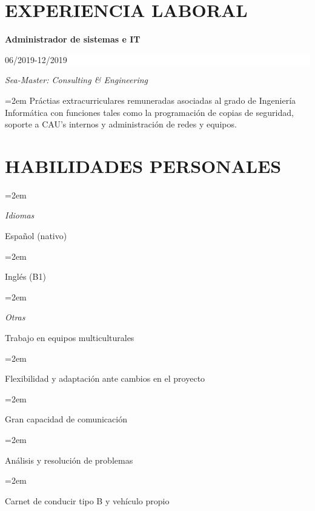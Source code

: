 \documentclass[paper=a4,fontsize=11pt]{scrartcl}
\newlength{\spacebox}
\newcommand{\sepspace}{\vspace*{1em}}		%
\newcommand{\NewPart}[1]{\section*{\uppercase{#1}}}
\newcommand{\PersonalEntry}[2]{
		\noindent\hangindent=2em\hangafter=0 %
		\parbox{\spacebox}{        %
		\textit{#1}}		       %
		\hspace{1.5em} #2 \par}    %
\newcommand{\SkillsEntry}[2]{      %
		\noindent\hangindent=2em\hangafter=0 %
		\parbox{\spacebox}{        %
		\textit{#1}}			   %
		\hspace{1.5em} #2 \par}    %
\newcommand{\EducationEntry}[4]{
		\noindent \textbf{#1} \hfill      %
		\colorbox{White}{%
			\parbox{5cm}{%
			\hfill\color{Black}#2}} \par  %
		\noindent \textit{#3} \par        %
		\noindent\hangindent=2em\hangafter=0 \small #4 %
		\normalsize \par}
\begin{document}
\NewPart{Experiencia laboral}
\EducationEntry{Administrador de sistemas e IT}{06/2019-12/2019}{Sea-Master: Consulting \& Engineering}{Práctias extracurriculares remuneradas asociadas al grado de Ingeniería Informática con funciones tales como la programación de copias de seguridad, soporte a CAU's internos y administración de redes y equipos.}

\NewPart{Habilidades personales}{}
\SkillsEntry{Idiomas}{Español (nativo)}
\SkillsEntry{}{Inglés (B1)}

\sepspace

\SkillsEntry{Otras}{Trabajo en equipos multiculturales}
\SkillsEntry{}{Flexibilidad y adaptación ante cambios en el proyecto}
\SkillsEntry{}{Gran capacidad de comunicación}
\SkillsEntry{}{Análisis y resolución de problemas}
\SkillsEntry{}{Carnet de conducir tipo B y vehículo propio}




\end{document}
